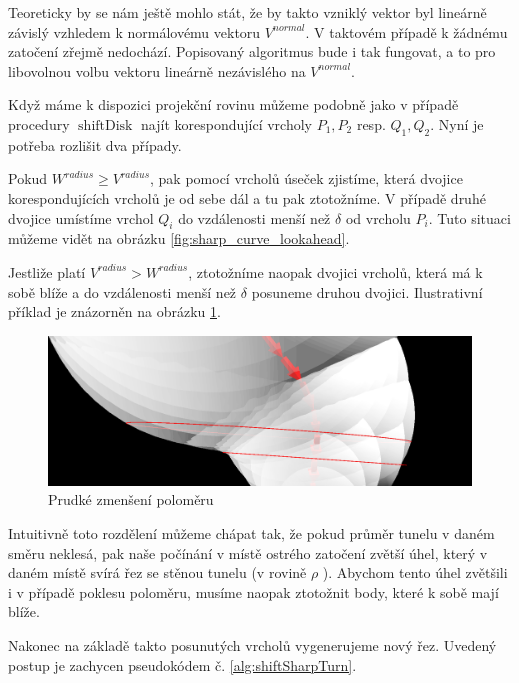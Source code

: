 Teoreticky by se nám ještě mohlo stát, že by takto vzniklý vektor byl lineárně
závislý vzhledem k normálovému vektoru $ V^{normal} $. V taktovém případě k žádnému
zatočení zřejmě nedochází. Popisovaný algoritmus bude i tak fungovat,
a to pro libovolnou volbu vektoru lineárně nezávislého na $ V^{normal} $.

Když máme k dispozici projekční rovinu můžeme podobně jako v případě
procedury $ \operatorname{shiftDisk} $ najít korespondující
vrcholy $ P_1, P_2 $ resp. $ Q_1, Q_2 $. Nyní je potřeba rozlišit dva případy.

Pokud $ W^{radius} \geq V^{radius} $, pak pomocí vrcholů úseček zjistíme, která
dvojice korespondujících vrcholů je od sebe dál a tu pak ztotožníme. V případě
druhé dvojice umístíme vrchol $Q_i $ do vzdálenosti menší než $\delta$ od vrcholu
$ P_i $. Tuto situaci můžeme vidět na obrázku \ref{fig:sharp_curve_lookahead}.

Jestliže platí $ V^{radius} > W^{radius} $, ztotožníme naopak dvojici vrcholů,
která má k sobě blíže a do vzdálenosti menší než $\delta$ posuneme druhou dvojici.
Ilustrativní příklad je znázorněn na obrázku \ref{fig:sharp_curve_lookahead_decrease}.

\begin{figure}[ht]
    \centering
    \includegraphics[width=\textwidth]{img/sharp_curve_lookahead_decrease.png}
    \caption{Prudké zmenšení poloměru}
  \centering
  \label{fig:sharp_curve_lookahead_decrease}
\end{figure}

Intuitivně toto rozdělení můžeme chápat tak, že pokud průměr tunelu v daném směru
neklesá, pak naše počínání v místě ostrého zatočení zvětší úhel, který v daném
místě svírá řez se stěnou tunelu (v rovině $ \rho $ ). Abychom tento úhel zvětšili
i v případě poklesu poloměru, musíme naopak ztotožnit body, které k sobě mají
blíže.

Nakonec na základě takto posunutých vrcholů vygenerujeme nový řez. Uvedený
postup je zachycen pseudokódem č. \ref{alg:shiftSharpTurn}.

